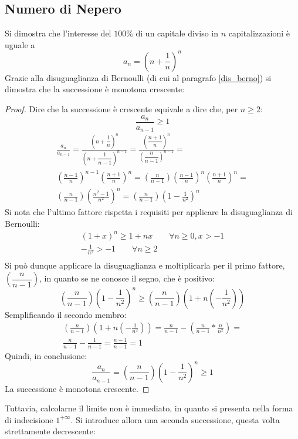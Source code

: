 \subsection{Numero di Nepero}
Si dimostra che l'interesse del $100\%$ di un capitale diviso in $n$ capitalizzazioni è uguale a
\[
	a_n=\left(n+\frac{1}{n}\right)^n
\]
Grazie alla disuguaglianza di Bernoulli (di cui al paragrafo \vref{dis_berno}) si dimostra che la successione è monotona crescente:
\begin{proof}
	Dire che la successione è crescente equivale a dire che, per $n\geq2$:
	\[
		\frac{a_n}{a_{n-1}}\geq1
	\]
	\begin{gather*}
		\frac{a_n}{a_{n-1}}=\frac{\left(n+\dfrac{1}{n}\right)^n}{\left(n+\dfrac{1}{n-1}\right)^{n-1}}=\frac{\left(\dfrac{n+1}{n}\right)^n}{\left(\dfrac{n}{n-1}\right)^{n-1}}=\\
		\left(\frac{n-1}{n}\right)^{n-1}\left(\frac{n+1}{n}\right)^n=\left(\frac{n}{n-1}\right)\left(\frac{n-1}{n}\right)^n\left(\frac{n+1}{n}\right)^n=\\
		\left(\frac{n}{n-1}\right)\left(\frac{n^2-1}{n^2}\right)^n=\left(\frac{n}{n-1}\right)\left(1-\frac{1}{n^2}\right)^n
	\end{gather*}
	Si nota che l'ultimo fattore rispetta i requisiti per applicare la disuguaglianza di Bernoulli:
	\begin{gather*}
		(1+x)^n\geq1+nx\qquad\forall n\geq0,x>-1\\
		-\frac{1}{n^2}>-1\qquad\forall n\geq2\\
	\end{gather*}
	Si può dunque applicare la disuguaglianza e moltiplicarla per il primo fattore, $\left(\dfrac{n}{n-1}\right)$, in quanto se ne conosce il segno, che è positivo:
	\[
		\left(\frac{n}{n-1}\right)\left(1-\frac{1}{n^2}\right)^n\geq\left(\frac{n}{n-1}\right)\left(1+n\left(-\frac{1}{n^2}\right)\right)
	\]
	Semplificando il secondo membro:
	\begin{gather*}
		\left(\frac{n}{n-1}\right)\left(1+n\left(-\frac{1}{n^2}\right)\right)=\frac{n}{n-1}-\left(\frac{n}{n-1}*\frac{n}{n^2}\right)=\\
		\frac{n}{n-1}-\frac{1}{n-1}=\frac{n-1}{n-1}=1
	\end{gather*}
	Quindi, in conclusione:
	\[
		\frac{a_n}{a_{n-1}}=\left(\frac{n}{n-1}\right)\left(1-\frac{1}{n^2}\right)^n\geq1
	\]
	La successione è monotona crescente.
\end{proof}
Tuttavia, calcolarne il limite non è immediato, in quanto si presenta nella forma di indecisione $1^{+\infty}$. Si introduce allora una seconda successione, questa volta strettamente decrescente:

